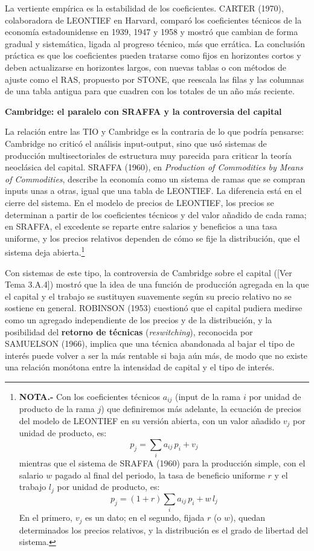 \documentclass[10pt,a4paper]{article}
\newcommand{\authorfont}[1]{{\fontfamily{EBGaramond-TLF}\selectfont #1}}
\begin{document}
La vertiente empírica es la estabilidad de los coeficientes. CARTER (1970), colaboradora de LEONTIEF en Harvard, comparó los coeficientes técnicos de la economía estadounidense en 1939, 1947 y 1958 y mostró que cambian de forma gradual y sistemática, ligada al progreso técnico, más que errática. La conclusión práctica es que los coeficientes pueden tratarse como fijos en horizontes cortos y deben actualizarse en horizontes largos, con nuevas tablas o con métodos de ajuste como el RAS, propuesto por STONE, que reescala las filas y las columnas de una tabla antigua para que cuadren con los totales de un año más reciente.

\textbf{Cambridge: el paralelo con SRAFFA y la controversia del capital}

La relación entre las TIO y Cambridge es la contraria de lo que podría pensarse: Cambridge no criticó el análisis input-output, sino que usó sistemas de producción multisectoriales de estructura muy parecida para criticar la teoría neoclásica del capital. SRAFFA (1960), en \textit{Production of Commodities by Means of Commodities}, describe la economía como un sistema de ramas que se compran inputs unas a otras, igual que una tabla de LEONTIEF. La diferencia está en el cierre del sistema. En el modelo de precios de LEONTIEF, los precios se determinan a partir de los coeficientes técnicos y del valor añadido de cada rama; en SRAFFA, el excedente se reparte entre salarios y beneficios a una tasa uniforme, y los precios relativos dependen de cómo se fije la distribución, que el sistema deja abierta.\footnote{%
    \textbf{NOTA.-} Con los coeficientes técnicos $a_{ij}$ (input de la rama $i$ por unidad de producto de la rama $j$) que definiremos más adelante, la ecuación de precios del modelo de LEONTIEF en su versión abierta, con un valor añadido $v_j$ por unidad de producto, es:
    $$p_j=\sum_i a_{ij}\,p_i+v_j$$
    mientras que el sistema de SRAFFA (1960) para la producción simple, con el salario $w$ pagado al final del periodo, la tasa de beneficio uniforme $r$ y el trabajo $l_j$ por unidad de producto, es:
    $$p_j=(1+r)\sum_i a_{ij}\,p_i+w\,l_j$$
    En el primero, $v_j$ es un dato; en el segundo, fijada $r$ (o $w$), quedan determinados los precios relativos, y la distribución es el grado de libertad del sistema.
}

Con sistemas de este tipo, la controversia de Cambridge sobre el capital ([\authorfont{Ver Tema 3.A.4}]) mostró que la idea de una función de producción agregada en la que el capital y el trabajo se sustituyen suavemente según su precio relativo no se sostiene en general. ROBINSON (1953) cuestionó que el capital pudiera medirse como un agregado independiente de los precios y de la distribución, y la posibilidad del \textbf{retorno de técnicas} (\textit{reswitching}), reconocida por SAMUELSON (1966), implica que una técnica abandonada al bajar el tipo de interés puede volver a ser la más rentable si baja aún más, de modo que no existe una relación monótona entre la intensidad de capital y el tipo de interés.
\end{document}

